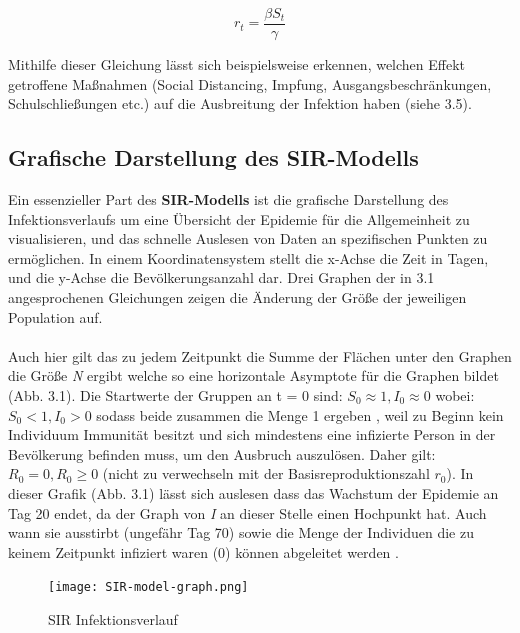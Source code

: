\documentclass[12pt]{scrartcl} %
\begin{document}
$$ r_{t} = \frac{\beta S_{t}}{\gamma} $$

Mithilfe dieser Gleichung lässt sich beispielsweise erkennen, welchen Effekt getroffene Maßnahmen (Social Distancing, Impfung, Ausgangsbeschränkungen, Schulschließungen etc.) auf die Ausbreitung der Infektion haben 
(siehe 3.5).


\subsection{Grafische Darstellung des SIR-Modells}

Ein essenzieller Part des \textbf{SIR-Modells} ist die grafische Darstellung des Infektionsverlaufs um eine Übersicht der Epidemie für die Allgemeinheit zu visualisieren, und das schnelle Auslesen von Daten an spezifischen Punkten zu ermöglichen.
In einem Koordinatensystem stellt die x-Achse die Zeit in Tagen, und die y-Achse die Bevölkerungsanzahl dar. Drei Graphen der in 3.1 angesprochenen Gleichungen zeigen die Änderung der Größe der jeweiligen Population auf.\\
\\
Auch hier gilt das zu jedem Zeitpunkt die Summe der Flächen unter den Graphen die Größe \textit{N} ergibt welche so eine horizontale Asymptote für die Graphen bildet (Abb. 3.1).
Die Startwerte der Gruppen an t = 0 sind: 
$S_{0} \approx 1, I_{0} \approx 0$ wobei: $ S_{0} < 1, I_{0} > 0$ sodass beide zusammen die Menge 1 ergeben \cite{4},
weil zu Beginn kein Individuum Immunität besitzt und sich mindestens eine infizierte Person in der Bevölkerung befinden muss, um den Ausbruch auszulösen. Daher gilt: $R_{0} = 0, R_{0} \geq 0$ (nicht zu verwechseln mit der Basisreproduktionszahl $r_{0}$).
In dieser Grafik (Abb. 3.1) lässt sich auslesen dass das Wachstum der Epidemie an Tag 20 endet, da der Graph von \textit{I} an dieser Stelle einen Hochpunkt hat. Auch wann sie ausstirbt (ungefähr Tag 70) sowie die Menge der Individuen die zu keinem Zeitpunkt infiziert waren (0) können abgeleitet werden \cite{1}.

	\begin{figure}[h]
	\centering
	\texttt{[image: SIR-model-graph.png]}
	\caption[SIR Infektionsverlauf,\newline https://www.davidketcheson.info/2020/03/17/SIR\textunderscore model.html]{SIR Infektionsverlauf}
	\end{figure}

\end{document}

